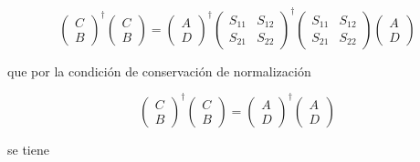 \documentclass[12pt,a4paper]{article}
\begin{document}
\begin{enumerate}
    \begin{equation*}
        \left(\begin{matrix}
         C \\
         B
        \end{matrix}\right)^{\dagger}\left(\begin{matrix}
         C \\
         B
        \end{matrix}\right) = 
        \left(\begin{matrix}
         A \\
         D
        \end{matrix}\right)^{\dagger}
        \left(\begin{matrix}
         S_{11} & S_{12} \\
         S_{21} & S_{22}
        \end{matrix}\right)^{\dagger} \left(\begin{matrix}
         S_{11} & S_{12} \\
         S_{21} & S_{22}
        \end{matrix}\right)
        \left(\begin{matrix}
         A \\
         D
        \end{matrix}\right)
    \end{equation*}
    
    que por la condición de conservación de normalización
    
    \begin{equation*}
        \left(\begin{matrix}
         C \\
         B
        \end{matrix}\right)^{\dagger}\left(\begin{matrix}
         C \\
         B
        \end{matrix}\right) = 
        \left(\begin{matrix}
         A \\
         D
        \end{matrix}\right)^{\dagger}
        \left(\begin{matrix}
         A \\
         D
        \end{matrix}\right)
    \end{equation*}
    
    se tiene
    

\end{enumerate}
\end{document}
